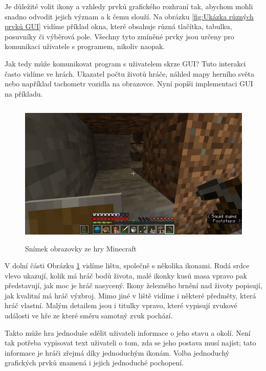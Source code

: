 \documentclass[12pt]{article}
\begin{document}
Je důležité volit ikony a vzhledy prvků grafického rozhraní tak, abychom mohli snadno odvodit jejich význam a k čemu slouží. Na obrázku \ref{fig:Ukázka různých prvků GUI} vidíme příklad okna, které obsahuje různá tlačítka, tabulku, posuvníky či výběrová pole. Všechny tyto zmíněné prvky jsou určeny pro komunikaci uživatele s programem, nikoliv naopak.

Jak tedy může komunikovat program s uživatelem skrze GUI? Tuto interakci často vidíme ve hrách. Ukazatel počtu životů hráče, náhled mapy herního světa nebo například tachometr vozidla na obrazovce. Nyní popíši implementaci GUI na příkladu.

\vspace{0.5cm}
\begin{figure}[h]
    \centering
    \includegraphics[height=7cm]{images/minecraft.png}
    \caption[Snímek obrazovky ze hry Minecraft]{Snímek obrazovky ze hry Minecraft \cite{minecraft_img}}
    \label{Snímek obrazovky ze hry Minecraft}
\end{figure}

V dolní části Obrázku \ref{Snímek obrazovky ze hry Minecraft} vidíme lištu, společně s několika ikonami. Rudá srdce vlevo ukazují, kolik má hráč bodů života, malé ikonky kusů masa vpravo pak představují, jak moc je hráč nasycený. Ikony železného brnění nad životy popisují, jak kvalitní má hráč výzbroj. Mimo jiné v liště vidíme i některé předměty, která hráč vlastní. Malým detailem jsou i titulky vpravo, které vypisují zvukové události ve hře ze které směru samotný zvuk pochází.

 Takto může hra jednoduše sdělit uživateli informace o jeho stavu a okolí. Není tak potřeba vypisovat text uživateli o tom, zda se jeho postava musí najíst; tato informace je hráči zřejmá díky jednoduchým ikonám. Volba jednoduchý grafických prvků znamená i jejich jednoduché pochopení.
\end{document}
